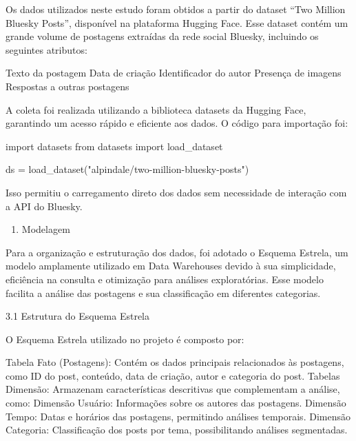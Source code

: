 \documentclass[
  letterpaper,
  DIV=11,
  numbers=noendperiod]{scrartcl}
\newenvironment{Shaded}{\begin{snugshade}}{\end{snugshade}}
\newcommand{\ImportTok}[1]{\textcolor[rgb]{0.00,0.46,0.62}{#1}}
\newcommand{\NormalTok}[1]{\textcolor[rgb]{0.00,0.23,0.31}{#1}}
\newcommand{\OperatorTok}[1]{\textcolor[rgb]{0.37,0.37,0.37}{#1}}
\newcommand{\StringTok}[1]{\textcolor[rgb]{0.13,0.47,0.30}{#1}}
\providecommand{\tightlist}{%
  \setlength{\itemsep}{0pt}\setlength{\parskip}{0pt}}\usepackage{longtable,booktabs,array}
\begin{document}
Os dados utilizados neste estudo foram obtidos a partir do dataset ``Two
Million Bluesky Posts'', disponível na plataforma Hugging Face. Esse
dataset contém um grande volume de postagens extraídas da rede social
Bluesky, incluindo os seguintes atributos:

\begin{VerbatimWithBreaks}
Texto da postagem
Data de criação
Identificador do autor
Presença de imagens
Respostas a outras postagens
\end{VerbatimWithBreaks}

A coleta foi realizada utilizando a biblioteca datasets da Hugging Face,
garantindo um acesso rápido e eficiente aos dados. O código para
importação foi:

\begin{Shaded}
\begin{Highlighting}[]
\ImportTok{import}\NormalTok{ datasets}
\ImportTok{from}\NormalTok{ datasets }\ImportTok{import}\NormalTok{ load\_dataset}

\NormalTok{ds }\OperatorTok{=}\NormalTok{ load\_dataset(}\StringTok{"alpindale/two{-}million{-}bluesky{-}posts"}\NormalTok{)}
\end{Highlighting}
\end{Shaded}

Isso permitiu o carregamento direto dos dados sem necessidade de
interação com a API do Bluesky.

\begin{enumerate}
\def\labelenumi{\arabic{enumi}.}
\setcounter{enumi}{2}
\tightlist
\item
  Modelagem 
\end{enumerate}

Para a organização e estruturação dos dados, foi adotado o Esquema
Estrela, um modelo amplamente utilizado em Data Warehouses devido à sua
simplicidade, eficiência na consulta e otimização para análises
exploratórias. Esse modelo facilita a análise das postagens e sua
classificação em diferentes categorias.

3.1 Estrutura do Esquema Estrela

O Esquema Estrela utilizado no projeto é composto por:

\begin{VerbatimWithBreaks}
Tabela Fato (Postagens): Contém os dados principais relacionados às postagens, como ID do post, conteúdo, data de criação, autor e categoria do post.
Tabelas Dimensão: Armazenam características descritivas que complementam a análise, como:
    Dimensão Usuário: Informações sobre os autores das postagens.
    Dimensão Tempo: Datas e horários das postagens, permitindo análises temporais.
    Dimensão Categoria: Classificação dos posts por tema, possibilitando análises segmentadas.
\end{VerbatimWithBreaks}
\end{document}
